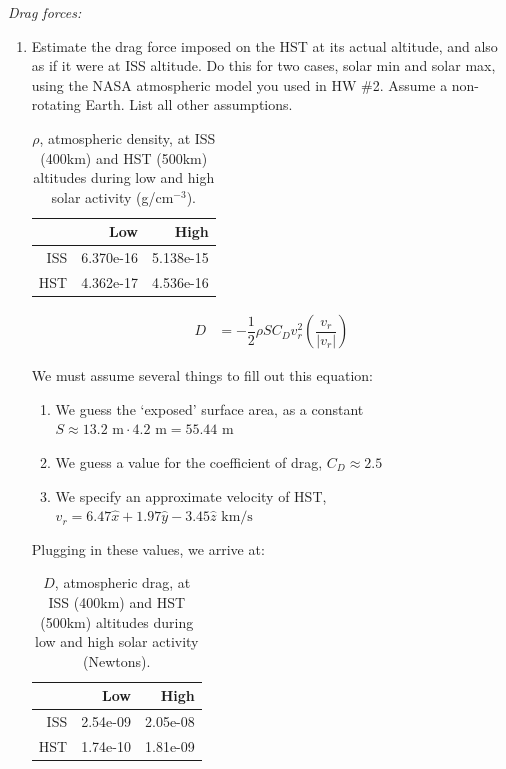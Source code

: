 \documentclass[onecolumn,10pt]{jhwhw}
\begin{document}
\clearpage
\problem{}
\textit{Drag forces:}
\begin{enumerate}
\item Estimate the drag force imposed on the HST at its actual altitude, and also as if it were at ISS altitude. Do this for two cases, solar min and solar max, using the NASA atmospheric model you used in HW \#2. Assume a non-rotating Earth. List all other assumptions.
\begin{table}[h]
\begin{center}
\begin{tabular}{rrr}
\toprule
    & Low & High \\
\midrule
ISS & 6.370e-16 & 5.138e-15 \\
HST & 4.362e-17 & 4.536e-16 \\
\bottomrule
\end{tabular}
\end{center}
\caption{$\rho$, atmospheric density, at ISS (400km) and HST (500km) altitudes during low and high solar activity (g/cm$^{-3}$).}
\end{table}
\begin{align*}
D &= -\dfrac{1}{2} \rho S C_D v^2_r \left( \dfrac{v_r}{|v_r|} \right)
\end{align*}

We must assume several things to fill out this equation:
\begin{enumerate}
\item We guess the `exposed' surface area, as a constant $S \approx 13.2 \mbox{ m} \cdot 4.2 \mbox{ m} = 55.44 \mbox{ m}$
\item We guess a value for the coefficient of drag, $C_D \approx 2.5$
\item We specify an approximate velocity of HST, $v_r = 6.47 \hat{x} + 1.97 \hat{y} - 3.45 \hat{z} \mbox{ km/s}$
\end{enumerate}
Plugging in these values, we arrive at:
\begin{table}[h]
\begin{center}
\begin{tabular}{rrr}
\toprule
    & Low & High \\
\midrule
ISS & 2.54e-09 & 2.05e-08 \\
HST & 1.74e-10 & 1.81e-09 \\
\bottomrule
\end{tabular}
\end{center}
\caption{$D$, atmospheric drag, at ISS (400km) and HST (500km) altitudes during low and high solar activity (Newtons).}
\end{table}


\end{enumerate}
\end{document}
